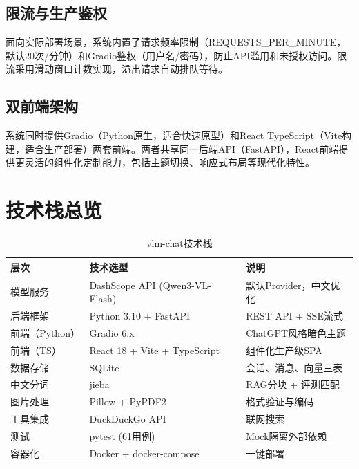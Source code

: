 \subsection{限流与生产鉴权}

面向实际部署场景，系统内置了请求频率限制（REQUESTS\_PER\_MINUTE，默认20次/分钟）和Gradio鉴权（用户名/密码），防止API滥用和未授权访问。限流采用滑动窗口计数实现，溢出请求自动排队等待。

\subsection{双前端架构}

系统同时提供Gradio（Python原生，适合快速原型）和React TypeScript（Vite构建，适合生产部署）两套前端。两者共享同一后端API（FastAPI），React前端提供更灵活的组件化定制能力，包括主题切换、响应式布局等现代化特性。

\section{技术栈总览}

\begin{table}[htbp]
  \centering
  \caption{vlm-chat技术栈}
  \label{tab:tech_stack}
  \begin{tabular}{|l|l|l|}
    \hline
    \textbf{层次} & \textbf{技术选型} & \textbf{说明} \\
    \hline
    模型服务 & DashScope API (Qwen3-VL-Flash) & 默认Provider，中文优化 \\
    \hline
    后端框架 & Python 3.10 + FastAPI & REST API + SSE流式 \\
    \hline
    前端（Python） & Gradio 6.x & ChatGPT风格暗色主题 \\
    \hline
    前端（TS） & React 18 + Vite + TypeScript & 组件化生产级SPA \\
    \hline
    数据存储 & SQLite & 会话、消息、向量三表 \\
    \hline
    中文分词 & jieba & RAG分块 + 评测匹配 \\
    \hline
    图片处理 & Pillow + PyPDF2 & 格式验证与编码 \\
    \hline
    工具集成 & DuckDuckGo API & 联网搜索 \\
    \hline
    测试 & pytest (61用例) & Mock隔离外部依赖 \\
    \hline
    容器化 & Docker + docker-compose & 一键部署 \\
    \hline
  \end{tabular}
\end{table}
